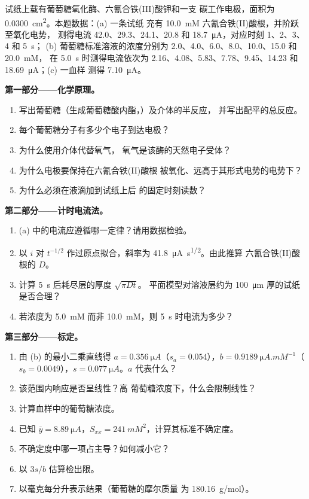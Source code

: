 \begin{problem}
\label{pb:b3:electrode-kinetics:1}
试纸上载有葡萄糖氧化酶、六氰合铁(III)酸钾和一支
碳工作电极，面积为 \qty{0.0300}{cm^2}。本题数据：(a) 一条试纸
充有 \qty{10.0}{mM} 六氰合铁(II)酸根，并阶跃至氧化电势，
测得电流 42.0、29.3、24.1、20.8 和 \qty{18.7}{\micro A}，对应时刻 1、2、3、4 和 \qty{5}{s}；
(b) 葡萄糖标准溶液的浓度分别为 2.0、4.0、6.0、8.0、10.0、15.0 和 \qty{20.0}{mM}，
在 \qty{5.0}{s} 时测得电流依次为 2.16、4.08、5.83、7.78、9.45、14.23 和 \qty{18.69}{\micro A}；(c) 一血样
测得 \qty{7.10}{\micro A}。

\medskip\noindent\textbf{第一部分——化学原理。}
\begin{enumerate}
  \item 写出葡萄糖（生成葡萄糖酸内酯，）及介体的半反应，
        并写出配平的总反应。
  \item 每个葡萄糖分子有多少个电子到达电极？
  \item 为什么使用介体代替氧气，
        氧气是该酶的天然电子受体？
  \item 为什么电极要保持在六氰合铁(II)酸根
        被氧化、远高于其形式电势的电势下？
  \item 为什么必须在液滴加到试纸上后
        的固定时刻读数？
\end{enumerate}

\medskip\noindent\textbf{第二部分——计时电流法。}
\begin{enumerate}[resume]
  \item (a) 中的电流应遵循哪一定律？请用数据检验。
  \item 以 $i$ 对 $t^{-1/2}$ 作过原点拟合，斜率为 \qty{41.8}{\micro A.s^{1/2}}。由此推算
        六氰合铁(II)酸根的 $D$。
  \item 计算 \qty{5}{s} 后耗尽层的厚度 $\sqrt{\pi Dt}$。
        平面模型对溶液层约为
        \qty{100}{\micro m} 厚的试纸是否合理？
  \item 若浓度为 \qty{5.0}{mM} 而非 \qty{10.0}{mM}，则 \qty{5}{s} 时电流为多少？
\end{enumerate}

\medskip\noindent\textbf{第三部分——标定。}
\begin{enumerate}[resume]
  \item 由 (b) 的最小二乘直线得 $a = \qty{0.356}{\micro A}$（$s_a = 0.054$），$b =
        \qty{0.9189}{\micro A.mM^{-1}}$（$s_b = 0.0049$），$s = \qty{0.077}{\micro A}$。$a$ 代表什么？
  \item 该范围内响应是否呈线性？高
        葡萄糖浓度下，什么会限制线性？
  \item 计算血样中的葡萄糖浓度。
  \item 已知 $\bar y = \qty{8.89}{\micro A}$，$S_{xx} = \qty{241}{mM^2}$，计算其标准不确定度。
  \item 不确定度中哪一项占主导？如何减小它？
  \item 以 $3s/b$ 估算检出限。
  \item 以毫克每分升表示结果（葡萄糖的摩尔质量
        为 \qty{180.16}{g/mol}）。
\end{enumerate}


\end{problem}
